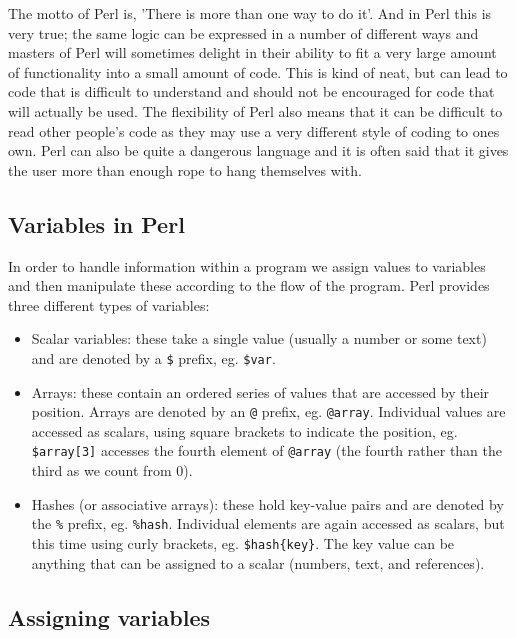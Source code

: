 \documentclass[11pt]{article}
\begin{document}
The motto of Perl is, 'There is more than one way to do it'. And in Perl
this is very true; the same logic can be expressed in a number of
different ways and masters of Perl will sometimes delight in their
ability to fit a very large amount of functionality into a small amount
of code. This is kind of neat, but can lead to code that is difficult to
understand and should not be encouraged for code that will
actually be used. The flexibility of Perl also means that it can be
difficult to read other people's code as they may use a very different
style of coding to ones own. Perl can also be quite a dangerous language
and it is often said that it gives the user more than enough rope to
hang themselves with.

\subsection{Variables in Perl}
\label{sec-5-1}

In order to handle information within a program we assign values to
variables and then manipulate these according to the flow of the
program. Perl provides three different types of variables:

\begin{itemize}
\item Scalar variables: these take a single value (usually a number or some text) 
and are denoted by a \texttt{\$} prefix, eg. \texttt{\$var}.

\item Arrays: these contain an ordered series of values that are accessed by their
position. Arrays are denoted by an \texttt{@} prefix, eg. \texttt{@array}.
Individual values are accessed as scalars, using square brackets to
indicate the position, eg. \texttt{\$array[3]} accesses the fourth element of
\texttt{@array} (the fourth rather than the third as we count from 0).

\item Hashes (or associative arrays): these hold key-value pairs and are
denoted by the \texttt{\%} prefix, eg. \texttt{\%hash}. Individual elements are again
accessed as scalars, but this time using curly brackets, eg.
\texttt{\$hash\{key\}}. The key value can be anything that can be assigned to a
scalar (numbers, text, and references).
\end{itemize}

\subsection{Assigning variables}
\label{sec-5-2}
\end{document}
